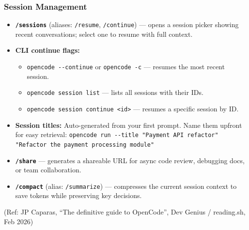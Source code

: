 \begin{frame}[fragile]\frametitle{Session Management}
  \begin{itemize}
    \item \textbf{\texttt{/sessions}} (aliases: \texttt{/resume}, \texttt{/continue}) --- opens a session picker showing recent conversations; select one to resume with full context.
    \item \textbf{CLI continue flags:}
      \begin{itemize}
        \item \lstinline|opencode --continue| or \lstinline|opencode -c| --- resumes the most recent session.
        \item \lstinline|opencode session list| --- lists all sessions with their IDs.
        \item \lstinline|opencode session continue <id>| --- resumes a specific session by ID.
      \end{itemize}
    \item \textbf{Session titles:} Auto-generated from your first prompt. Name them upfront for easy retrieval:
      \lstinline|opencode run --title "Payment API refactor" "Refactor the payment processing module"|
    \item \textbf{\texttt{/share}} --- generates a shareable URL for async code review, debugging docs, or team collaboration.
    \item \textbf{\texttt{/compact}} (alias: \texttt{/summarize}) --- compresses the current session context to save tokens while preserving key decisions.
  \end{itemize}
{\tiny (Ref: JP Caparas, ``The definitive guide to OpenCode'', Dev Genius / reading.sh, Feb 2026)}
\end{frame}


